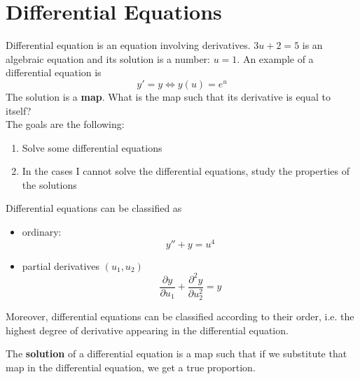 \chapter{Differential Equations}

Differential equation is an equation involving derivatives. 
$3u+2=5$ is an algebraic equation and its solution is a number: $u=1$.
An example of a differential equation is
\begin{equation*}
    y' = y\Leftrightarrow y(u)=e^u
\end{equation*}
The solution is a \textbf{map}. What is the map such that its derivative is equal to itself?\\

The goals are the following:
\begin{enumerate}
    \item Solve some differential equations
    \item In the cases I cannot solve the differential equations, study the properties of the solutions
\end{enumerate}

Differential equations can be classified as
\begin{itemize}
    \item ordinary:\\
    \begin{equation*}
        y''+y=u^4
    \end{equation*}
    \item partial derivatives $(u_1, u_2)$
    \begin{equation*}
        \frac{\partial y}{\partial u_1} + \frac{\partial^2 y}{\partial u_2^2} = y
    \end{equation*}
\end{itemize}

Moreover, differential equations can be classified according to their order, i.e. the highest degree of derivative appearing in the differential equation.


The \textbf{solution} of a differential equation is a map such that if we substitute that map in the differential equation,
we get a true proportion.

